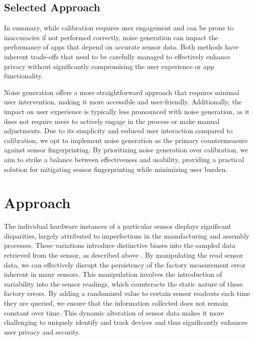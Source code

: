 \documentclass[11pt,
  oneside,openany,    %
]{scrreprt}
\begin{document}
\section{Selected Approach}
\label{sec:approach}
In summary, while calibration requires user engagement and can be prone to inaccuracies if not performed correctly, noise generation can impact the performance of apps that depend on accurate sensor data. 
Both methods have inherent trade-offs that need to be carefully managed to effectively enhance privacy without significantly compromising the user experience or app functionality.

Noise generation offers a more straightforward approach that requires minimal user intervention, making it more accessible and user-friendly.
Additionally, the impact on user experience is typically less pronounced with noise generation, as it does not require users to actively engage in the process or make manual adjustments. 
Due to its simplicity and reduced user interaction compared to calibration, we opt to implement noise generation as the primary countermeasure against sensor fingerprinting. 
By prioritizing noise generation over calibration, we aim to strike a balance between effectiveness and usability, providing a practical solution for mitigating sensor fingerprinting while minimizing user burden.

\chapter{Approach}
\label{chap:approach}
The individual hardware instances of a particular sensor displays significant disparities, largely attributed to imperfections in the manufacturing and assembly processes. 
These variations introduce distinctive biases into the sampled data retrieved from the sensor, as described above \cite{DBLP:conf/sp/ZhangBS19, DBLP:conf/ndss/DeyRXCN14, DBLP:conf/ccs/DasBC14}. 
By manipulating the read sensor data, we can effectively disrupt the persistency of the factory measurement error inherent in many sensors.
This manipulation involves the introduction of variability into the sensor readings, which counteracts the static nature of these factory errors.
By adding a randomized value to certain sensor readouts each time they are queried, we ensure that the information collected does not remain constant over time.
This dynamic alteration of sensor data makes it more challenging to uniquely identify and track devices and thus significantly enhances user privacy and security.
\end{document}
